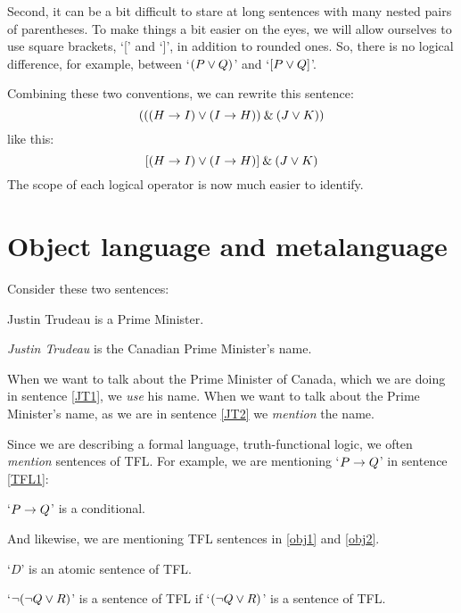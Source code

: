 Second, it can be a bit difficult to stare at long sentences with many nested pairs of parentheses. To make things a bit easier on the eyes, we will allow ourselves to use square brackets, `[' and `]', in addition to rounded ones. So, there is no logical difference, for example, between `$(P\vee Q)$' and `$[P\vee Q]$'. 

Combining these two conventions, we can rewrite this sentence:
$$(((H \rightarrow I) \vee (I \rightarrow H)) \mathbin{\&} (J \vee K))$$
like this:
$$[(H \rightarrow I) \vee (I \rightarrow H)] \mathbin{\&} (J \vee K)$$
The scope of each logical operator is now much easier to identify.




\noindent\begin{minipage}{1.0\textwidth}
\section{Object language and metalanguage}\label{s:Metalanguage}

Consider these two sentences:
	\begin{earg}
		\item[\ex{JT1}] Justin Trudeau is a Prime Minister.
		\item[\ex{JT2}] \textit{Justin Trudeau} is the Canadian Prime Minister's name.
	\end{earg}
When we want to talk about the Prime Minister of Canada, which we are doing in sentence \ref{JT1}, we \textit{use} his name. When we want to talk about the Prime Minister's name, as we are in sentence \ref{JT2} we \emph{mention} the name.
\end{minipage}
\vspace{-3pt}

Since we are describing a formal language, truth-functional logic, we often \emph{mention} sentences of TFL. For example, we are mentioning `$P \rightarrow Q$' in sentence \ref{TFL1}:
\begin{earg}
		\item[\ex{TFL1}] `$P \rightarrow Q$' is a conditional.
\end{earg}

\noindent And likewise, we are mentioning TFL sentences in \ref{obj1} and \ref{obj2}. 
\begin{earg}
		\item[\ex{obj1}] `$D$' is an atomic sentence of TFL.
		\item[\ex{obj2}] `${\neg} ({\neg} Q \vee R)$' is a sentence of TFL if `$({\neg} Q \vee R)$' is a sentence of TFL.
\end{earg}

